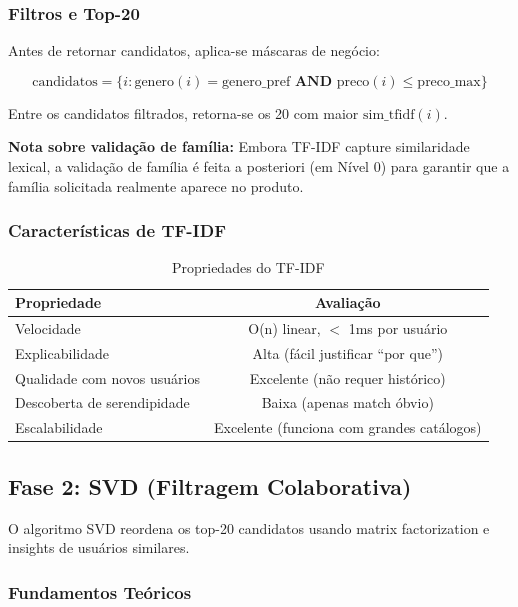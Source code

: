 \documentclass[12pt,a4paper]{article}
\begin{document}
\subsubsection{Filtros e Top-20}

Antes de retornar candidatos, aplica-se máscaras de negócio:

\begin{equation}
\text{candidatos} = \{i : \text{genero}(i) = \text{genero\_pref} \textbf{ AND } \text{preco}(i) \leq \text{preco\_max}\}
\end{equation}

Entre os candidatos filtrados, retorna-se os 20 com maior $\text{sim\_tfidf}(i)$.

\textbf{Nota sobre validação de família:} Embora TF-IDF capture similaridade lexical, a validação de família é feita a posteriori (em Nível 0) para garantir que a família solicitada realmente aparece no produto.

\subsubsection{Características de TF-IDF}

\begin{table}[H]
\centering
\begin{tabular}{|l|c|}
\toprule
\textbf{Propriedade} & \textbf{Avaliação} \\
\midrule
Velocidade & O(n) linear, $<$ 1ms por usuário \\
Explicabilidade & Alta (fácil justificar ``por que'') \\
Qualidade com novos usuários & Excelente (não requer histórico) \\
Descoberta de serendipidade & Baixa (apenas match óbvio) \\
Escalabilidade & Excelente (funciona com grandes catálogos) \\
\bottomrule
\end{tabular}
\caption{Propriedades do TF-IDF}
\label{tab:tfidf}
\end{table}

\subsection{Fase 2: SVD (Filtragem Colaborativa)}

O algoritmo SVD reordena os top-20 candidatos usando matrix factorization e insights de usuários similares.

\subsubsection{Fundamentos Teóricos}
\end{document}

